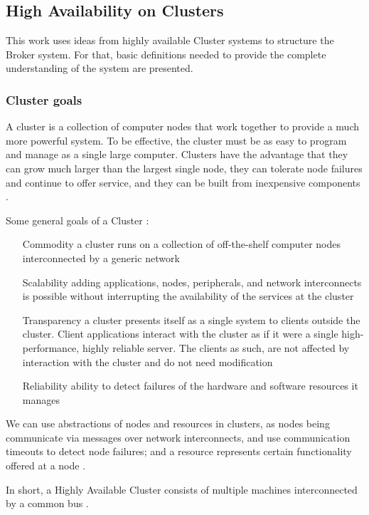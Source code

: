 \subsection{High Availability on Clusters}
This work uses ideas from highly available Cluster systems to structure the Broker system. For that, basic definitions needed to provide the complete understanding of the system are presented.

\subsubsection{Cluster goals}
A cluster is a collection of computer nodes that work
together to provide a much more powerful system. To be
effective, the cluster must be as easy to program and manage as a single large computer. Clusters have the advantage that they can grow much larger than the largest single
node, they can tolerate node failures and continue to offer
service, and they can be built from inexpensive components \cite{barreradesign}.

Some general goals of a Cluster \cite{barreradesign}:
\begin{itemize}
	\item[Commodity] a cluster runs on a collection of off-the-shelf computer nodes interconnected by a generic network 
	\item[Scalability] adding applications, nodes, peripherals,	and network interconnects is possible without interrupting the availability of the services at the cluster
	\item[Transparency] a cluster presents itself as a single system to clients outside the
	cluster. Client applications interact with the cluster as if it were a single high-performance, highly reliable server. The clients as such, are not affected by interaction with the cluster and do not need modification
	\item[Reliability] ability to detect failures of the hardware and software resources it manages
\end{itemize} 

We can use abstractions of nodes and resources in clusters, as nodes being communicate via messages over network interconnects, and use communication timeouts to detect node failures; and a resource represents certain functionality offered at a node \cite{barreradesign}.

In short, a Highly Available Cluster consists of multiple machines interconnected by a common bus \cite{azagury1994highly}.

